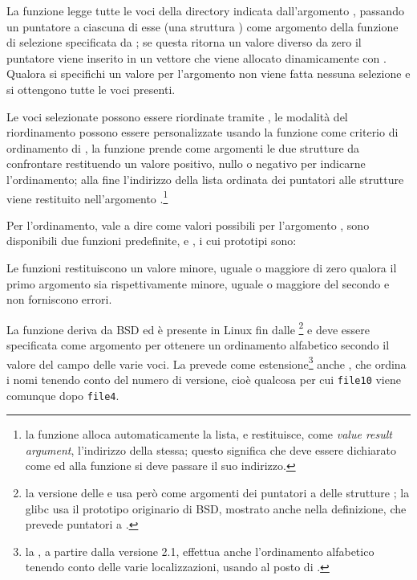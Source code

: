 La funzione legge tutte le voci della directory indicata dall'argomento
, passando un puntatore a ciascuna di esse (una struttura
) come argomento della funzione di selezione specificata da
; se questa ritorna un valore diverso da zero il puntatore viene
inserito in un vettore che viene allocato dinamicamente con .
Qualora si specifichi un valore  per l'argomento  non
viene fatta nessuna selezione e si ottengono tutte le voci presenti.

Le voci selezionate possono essere riordinate tramite , le
modalità del riordinamento possono essere personalizzate usando la funzione
 come criterio di ordinamento di , la funzione
prende come argomenti le due strutture  da confrontare
restituendo un valore positivo, nullo o negativo per indicarne l'ordinamento;
alla fine l'indirizzo della lista ordinata dei puntatori alle strutture
 viene restituito nell'argomento
.\footnote{la funzione alloca automaticamente la lista, e
  restituisce, come \textit{value result argument}, l'indirizzo della stessa;
  questo significa che  deve essere dichiarato come
   ed alla funzione si deve passare il suo
  indirizzo.}


Per l'ordinamento, vale a dire come valori possibili per l'argomento
, sono disponibili due funzioni predefinite,  e
, i cui prototipi sono:

\begin{funcproto}{
}
{Le funzioni restituiscono un valore minore, uguale o maggiore di zero qualora
  il primo argomento sia rispettivamente minore, uguale o maggiore del secondo
  e non forniscono errori.}
\end{funcproto}

La funzione  deriva da BSD ed è presente in Linux fin dalle
\footnote{la versione delle  e  usa però come
  argomenti dei puntatori a delle strutture ; la glibc usa il
  prototipo originario di BSD, mostrato anche nella definizione, che prevede
  puntatori a .} e deve essere specificata come argomento
 per ottenere un ordinamento alfabetico secondo il valore del
campo  delle varie voci. La  prevede come
estensione\footnote{la , a partire dalla versione 2.1, effettua
  anche l'ordinamento alfabetico tenendo conto delle varie localizzazioni,
  usando  al posto di .} anche
, che ordina i nomi tenendo conto del numero di versione,
cioè qualcosa per cui \texttt{file10} viene comunque dopo \texttt{file4}.

